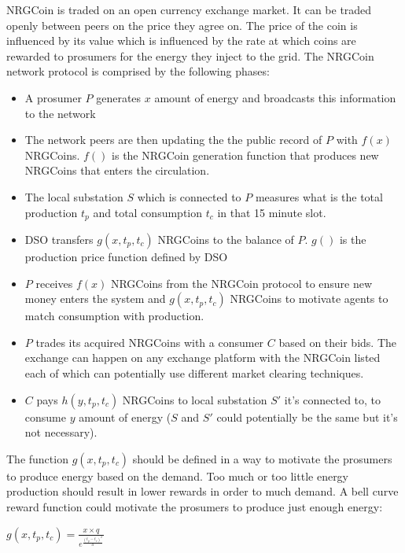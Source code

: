 NRGCoin is traded on an open currency exchange market. It can be traded openly between peers on the price they agree on. The price of the coin is influenced by
its value which is influenced by the rate at which coins are rewarded to prosumers for the energy they inject to the grid.
The NRGCoin network protocol is comprised by the following phases:
\begin{itemize}
    \item A prosumer $P$ generates $x$ amount of energy and broadcasts this information to the network
    \item The network peers are then updating the the public record of $P$ with $f(x)$ NRGCoins. $f()$ is the NRGCoin generation function that produces new
          NRGCoins that enters the circulation.
    \item The local substation $S$ which is connected to $P$ measures what is the total production $t_p$ and total consumption $t_c$ in
          that 15 minute slot.
    \item DSO transfers $g(x,t_p,t_c)$ NRGCoins to the balance of $P$. $g()$ is the production price function defined by DSO
    \item $P$ receives $f(x)$ NRGCoins from the NRGCoin protocol to ensure new money enters the system and $g(x,t_p,t_c)$ NRGCoins to motivate agents to match
          consumption with production.
    \item $P$ trades its acquired NRGCoins with a consumer $C$ based on their bids. The exchange can happen on any exchange platform with the NRGCoin listed
          each of which can potentially use different market clearing techniques.
    \item $C$ pays $h(y,t_p,t_c)$ NRGCoins to local substation $S'$ it's connected to, to consume $y$ amount of energy ($S$ and $S'$ could potentially be the same but it's not necessary).
\end{itemize}

The function $g(x,t_p,t_c)$ should be defined in a way to motivate the prosumers to produce energy based on the demand. Too much or too little energy production should result in lower
rewards in order to much demand. A bell curve reward function could motivate the prosumers to produce just enough energy:
\\
\begin{center}
    \begin{math}
        g(x,t_p,t_c) = \frac{x \times q}{e^\frac{(t_p-t_c)^2}{a}}
    \end{math}
\end{center}

